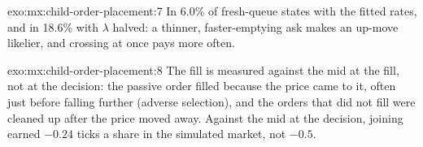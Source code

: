 \begin{solution}{exo:mx:child-order-placement:7}
In 6.0\% of fresh-queue states with the fitted rates, and in 18.6\% with $\lambda$ halved: a thinner, faster-emptying ask makes an up-move likelier,
and crossing at once pays more often.
\end{solution}

\begin{solution}{exo:mx:child-order-placement:8}
The fill is measured against the mid at the fill, not at the decision: the passive order filled because the price came to it, often just before
falling further (adverse selection), and the orders that did not fill were cleaned up after the price moved away. Against the mid at the decision,
joining earned $-0.24$ ticks a share in the simulated market, not $-0.5$.
\end{solution}

